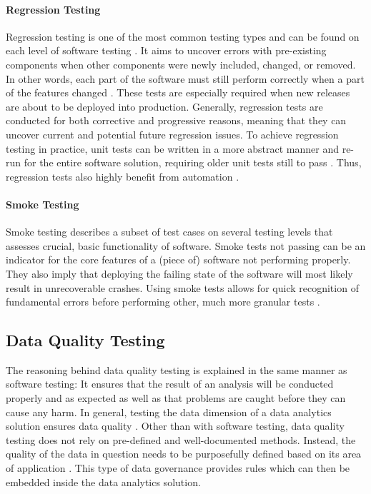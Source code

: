 \paragraph{Regression Testing}
Regression testing is one of the most common testing types \cite[70]{Mahfuz2016} and can be found on each level of software testing \cite{Mathur2013}. It aims to uncover errors with pre-existing components when other components were newly included, changed, or removed. In other words, each part of the software must still perform correctly when a part of the features changed \cite[70]{Mahfuz2016}\cite{Mathur2013}. These tests are especially required when new releases are about to be deployed into production. Generally, regression tests are conducted for both corrective and progressive reasons, meaning that they can uncover current and potential future regression issues. To achieve regression testing in practice, unit tests can be written in a more abstract manner and re-run for the entire software solution, requiring older unit tests still to pass \cite{Mathur2013}. Thus, regression tests also highly benefit from automation \cite{Mahfuz2016}.

\paragraph{Smoke Testing}
Smoke testing describes a subset of test cases on several testing levels that assesses crucial, basic functionality of software. Smoke tests not passing can be an indicator for the core features of a (piece of) software not performing properly. They also imply that deploying the failing state of the software will most likely result in unrecoverable crashes. Using smoke tests allows for quick recognition of fundamental errors before performing other, much more granular tests \cite[sec. 5]{Tarlinder2016}.

\subsection{Data Quality Testing} \label{sec:2-2-3-data-testing}
The reasoning behind data quality testing is explained in the same manner as software testing: It ensures that the result of an analysis will be conducted properly and as expected as well as that problems are caught before they can cause any harm. In general, testing the data dimension of a data analytics solution ensures data quality \cite[2]{Savanur2016}. Other than with software testing, data quality testing does not rely on pre-defined and well-documented methods. Instead, the quality of the data in question needs to be purposefully defined based on its area of application \cite[1]{Askham2013}\cite{Schieferdecker2012}\cite[116\psq]{Sneed2013}\cite[667]{Souibgui2019}. This type of data governance provides rules \cite{Schieferdecker2012}\cite[116\psq]{Sneed2013} which can then be embedded inside the data analytics solution. 

